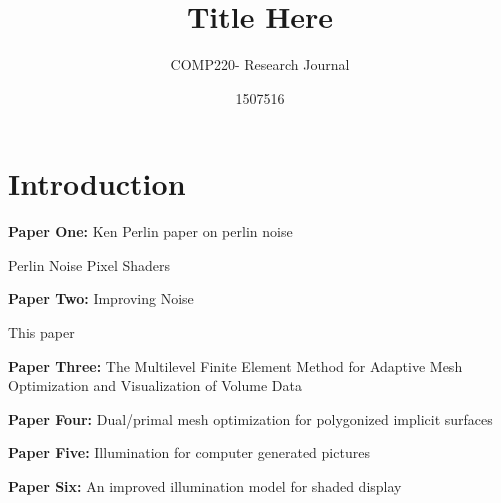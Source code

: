 \documentclass{scrartcl}
\title{Title Here}
\subtitle{COMP220- Research Journal}
\author{1507516}
\begin{document}
\maketitle

\abstract{}

\section{Introduction}

\textbf{Paper One:}
Ken Perlin paper on perlin noise

Perlin Noise Pixel Shaders
\cite{hart2001perlin}

\par

\textbf{Paper Two:}
Improving Noise
\cite{perlin2002improving}
\par

This paper

\par 

\textbf{Paper Three:}
The Multilevel Finite Element Method for Adaptive Mesh
Optimization and Visualization of Volume Data
\cite{grosso1997multilevel}
\par

\textbf{Paper Four:}
Dual/primal mesh optimization for polygonized implicit surfaces
\cite{ohtake2002dual}
\par

\textbf{Paper Five:}
Illumination for computer generated pictures
\cite{phong1975illumination}
\par

\textbf{Paper Six:}
An improved illumination model for shaded display
\cite{whitted2005improved}
\par





\end{document}
